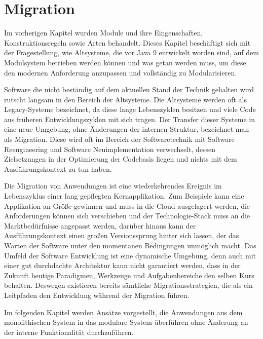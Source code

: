 
\newpage \chapter{Migration}
Im vorherigen Kapitel wurden Module und ihre Eingenschaften, Konstruktionsregeln sowie Arten behandelt. 
Dieses Kapitel beschäftigt sich mit der Fragestellung, wie Altsysteme, die vor Java 9 entwickelt worden sind, auf dem Modulsystem betrieben werden können und was getan werden muss, um diese den modernen Anforderung anzupassen und vollständig zu Modularisieren.\bigbreak

Software die nicht beständig auf dem aktuellen Stand der Technik gehalten wird rutscht langsam in den Bereich der Altsysteme. Die Altsysteme werden oft als Legacy-Systeme bezeichnet, da diese lange Lebenszyklen besitzen und viele Code aus früheren Entwicklungszyklen mit sich tragen. Der Transfer dieser Systeme in eine neue Umgebung, ohne Änderungen der internen Struktur, bezeichnet man als Migration. Diese wird oft im Bereich der Softwaretechnik mit Software Reengineering und Software Neuimplementation verwechselt, dessen Zielsetzungen in der Optimierung der Codebasis liegen und nichts mit dem Ausführungskontext zu tun haben. \bigbreak

Die Migration von Anwendungen ist eine wiederkehrendes Ereignis im Lebenszyklus einer lang gepflegten Kernapplikation.
Zum Beispiele kann eine Applikation an Größe gewinnen und muss in die Cloud ausgelagert werden, die Anforderungen können sich verschieben und der Technologie-Stack muss an die Marktbedürfnisse angepasst werden, darüber hinaus kann der Ausführungskontext einen großen Versionssprung hinter sich lassen, der das Warten der Software unter den momentanen Bedingungen unmöglich macht. Das Umfeld der Software Entwicklung ist eine dynamische Umgebung, denn auch mit einer gut durchdachte Architektur kann nicht garantiert werden, dass in der Zukunft heutige Paradigmen, Werkzeuge und Aufgabenbereiche den selben Kurs behalten. Deswegen existieren bereits sämtliche Migrationsstrategien, die als ein Leitpfaden den Entwicklung während der Migration führen. \bigbreak

Im folgenden Kapitel werden Ansätze vorgestellt, die Anwendungen aus dem monolithischen System in das modulare System überführen ohne Änderung an der interne Funktionalität durchzuführen. 


